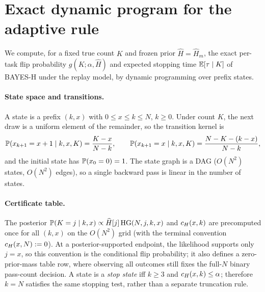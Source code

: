 \section{Exact dynamic program for the adaptive rule}
\label{app:dp}

We compute, for a fixed true count $K$ and frozen prior
$\widehat H=\widehat H_m$, the exact per-task flip probability
$g(K;\alpha,\widehat H)$ and expected stopping time $\E[\tau\mid K]$ of
BAYES-H under the replay model, by dynamic programming over prefix states.

\paragraph{State space and transitions.}
A state is a prefix $(k,x)$ with $0\le x\le k\le N$, $k\ge 0$. Under
count $K$, the next draw is a uniform element of the remainder, so the
transition kernel is
\[
\P(x_{k+1}=x+1\mid k,x,K)=\frac{K-x}{N-k},
\qquad
\P(x_{k+1}=x\mid k,x,K)=\frac{N-K-(k-x)}{N-k},
\]
and the initial state has $\P(x_0=0)=1$. The state graph is a DAG
($O(N^2)$ states, $O(N^2)$ edges), so a single backward pass is linear
in the number of states.

\paragraph{Certificate table.}
The posterior $\P(K=j\mid k,x)\propto \widehat H[j]\,\HG(N,j,k,x)$ and
$\cert(x,k)$ are precomputed once for all $(k,x)$ on the $O(N^2)$ grid
(with the terminal convention $\cert(x,N):=0$). At a posterior-supported
endpoint, the likelihood supports only $j=x$, so this convention is the
conditional flip probability; it also defines a zero-prior-mass table row,
where observing all outcomes still fixes the full-$N$ binary pass-count
decision. A state is a \emph{stop state} iff $k\ge 3$ and
$\cert(x,k)\le\alpha$; therefore $k=N$ satisfies the same stopping test,
rather than a separate truncation rule.

